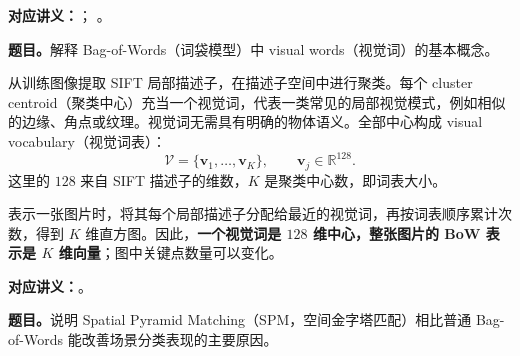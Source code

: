 
\label{tutorial:SC4061-TUT06}



\textbf{对应讲义：}；
。

\textbf{题目。}解释 Bag-of-Words（词袋模型）中 visual words（视觉词）的基本概念。

\begin{checkedsolution}
从训练图像提取 SIFT 局部描述子，在描述子空间中进行聚类。每个 cluster centroid（聚类中心）充当一个视觉词，代表一类常见的局部视觉模式，例如相似的边缘、角点或纹理。视觉词无需具有明确的物体语义。全部中心构成 visual vocabulary（视觉词表）：
\[
  \mathcal V=\{\bm v_1,\ldots,\bm v_K\},\qquad
  \bm v_j\in\mathbb R^{128}.
\]
这里的 $128$ 来自 SIFT 描述子的维数，$K$ 是聚类中心数，即词表大小。

表示一张图片时，将其每个局部描述子分配给最近的视觉词，再按词表顺序累计次数，得到 $K$ 维直方图。因此，\textbf{一个视觉词是 $128$ 维中心，整张图片的 BoW 表示是 $K$ 维向量}；图中关键点数量可以变化。
\end{checkedsolution}


\textbf{对应讲义：}。

\textbf{题目。}说明 Spatial Pyramid Matching（SPM，空间金字塔匹配）相比普通 Bag-of-Words 能改善场景分类表现的主要原因。

